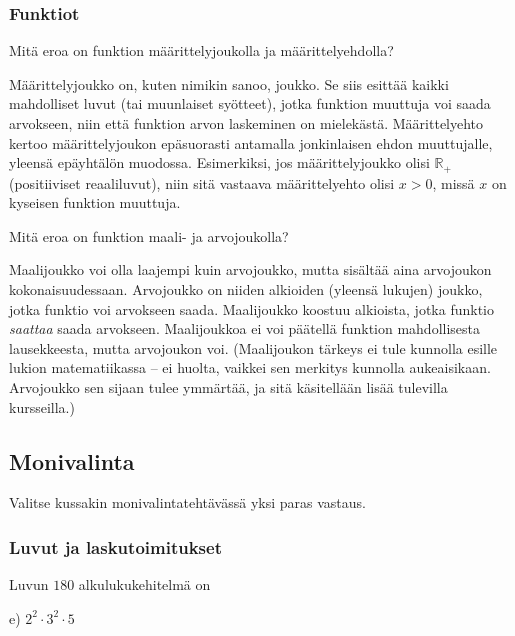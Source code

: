 \subsubsection*{Funktiot}

\begin{tehtava}
Mitä eroa on funktion määrittelyjoukolla ja määrittelyehdolla?
\begin{vastaus}
Määrittelyjoukko on, kuten nimikin sanoo, joukko. Se siis esittää kaikki mahdolliset luvut (tai muunlaiset syötteet), jotka funktion muuttuja voi saada arvokseen, niin että funktion arvon laskeminen on mielekästä. Määrittelyehto kertoo määrittelyjoukon epäsuorasti antamalla jonkinlaisen ehdon muuttujalle, yleensä epäyhtälön muodossa. Esimerkiksi, jos määrittelyjoukko olisi $\mathbb{R}_+$ (positiiviset reaaliluvut), niin sitä vastaava määrittelyehto olisi $x>0$, missä $x$ on kyseisen funktion muuttuja.
\end{vastaus}
\end{tehtava}

\begin{tehtava}
Mitä eroa on funktion maali- ja arvojoukolla?
	\begin{vastaus}
Maalijoukko voi olla laajempi kuin arvojoukko, mutta sisältää aina arvojoukon kokonaisuudessaan. Arvojoukko on niiden alkioiden (yleensä lukujen) joukko, jotka funktio voi arvokseen saada. Maalijoukko koostuu alkioista, jotka funktio \textit{saattaa} saada arvokseen. Maalijoukkoa ei voi päätellä funktion mahdollisesta lausekkeesta, mutta arvojoukon voi. (Maalijoukon tärkeys ei tule kunnolla esille lukion matematiikassa -- ei huolta, vaikkei sen merkitys kunnolla aukeaisikaan. Arvojoukko sen sijaan tulee ymmärtää, ja sitä käsitellään lisää tulevilla kursseilla.)
	\end{vastaus}
\end{tehtava}

\newpage
\subsection*{Monivalinta}

Valitse kussakin monivalintatehtävässä yksi paras vastaus.

\subsubsection*{Luvut ja laskutoimitukset}

\begin{tehtava}
Luvun $180$ alkulukukehitelmä on
	\begin{vastaus}
	 e) $2^2\cdot3^2\cdot5$
	\end{vastaus}
\end{tehtava}

